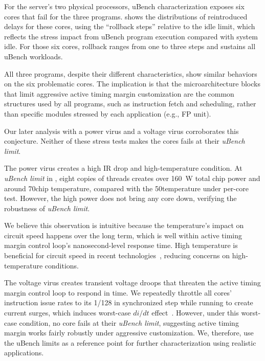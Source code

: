 For the server's two physical processors, uBench characterization exposes six cores that fail for the three programs.  shows the distributions of reintroduced delays for these cores, using the ``rollback steps'' relative to the idle limit, which reflects the stress impact from uBench program execution compared with system idle. For those six cores, rollback ranges from one to three steps and sustains all uBench workloads.

All three programs, despite their different characteristics, show similar behaviors on the six problematic cores. The implication is that the microarchitecture blocks that limit aggressive active timing margin customization are the common structures used by all programs, such as instruction fetch and scheduling, rather than specific modules stressed by each application (e.g., FP unit).

Our later analysis with a power virus and a voltage virus corroborates this conjecture. Neither of these stress tests makes the cores fails at their \textit{uBench limit}.

The power virus creates a high IR drop and high-temperature condition. At \textit{uBench limit} in , eight copies of  threads creates over 160~W total chip power and around 70\C chip temperature, compared with the 50\C temperature under per-core test. However, the high power does not bring any core down, verifying the robustness of \textit{uBench limit}. 

We believe this observation is intuitive because the temperature's impact on circuit speed happens over the long term, which is well within active timing margin control loop's nanosecond-level response time. High temperature is beneficial for circuit speed in recent technologies~\cite{zu2016tistate}, reducing concerns on high-temperature conditions.

The voltage virus creates transient voltage droops that threaten the active timing margin control loop to respond in time. We repeatedly throttle all cores' instruction issue rates to its 1/128 in synchronized step while running  to create current surges, which induces worst-case $di/dt$ effect~\cite{lefurgy2011active, lefurgy2013active}. However, under this worst-case condition, no core fails at their \textit{uBench limit}, suggesting active timing margin works fairly robustly under aggressive customization. We, therefore, use the uBench limits as a reference point for further characterization using realistic applications.

